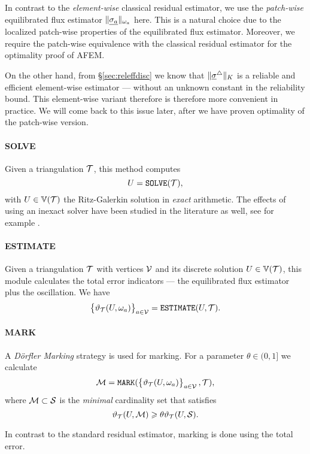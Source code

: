 \documentclass[thesis.tex]{subfiles}
\begin{document}
\begin{rem}
  In contrast to the \emph{element-wise} classical residual estimator, we use the \emph{patch-wise} equilibrated flux estimator $\| \underline{\sigma_a} \|_{\omega_a}$ here. This
  is a natural choice due to the localized patch-wise properties of the equilibrated flux estimator. 
  Moreover, we require the patch-wise equivalence with the classical residual estimator for the optimality proof of AFEM.

  On the other hand, from \S\ref{sec:releffdisc} we know that $\| \underline{\sigma}^\triangle \|_K$ is a reliable and efficient
  element-wise estimator --- without an unknown constant in the reliability bound. This element-wise variant
  therefore is therefore more convenient in practice. We will come back to this issue later, after we have proven
  optimality of the patch-wise version.
\end{rem}


\paragraph{SOLVE}Given a triangulation $\mathcal{T}$, this method computes
\[
  U = \texttt{SOLVE}(\mathcal{T}),
\]
with $U \in \mathbb{V}(\mathcal{T})$ the  Ritz-Galerkin solution in \emph{exact} arithmetic. The effects of using an inexact solver have
been studied in the literature as well, see for example \cite[\S7]{carstensen2014axioms}.
\paragraph{ESTIMATE} Given a triangulation $\mathcal{T}$ with vertices $\mathcal{V}$ and its discrete solution $U \in \mathbb{V}(\mathcal{T})$, this module 
calculates the total error indicators --- the equilibrated flux estimator plus the oscillation. We have
\[
  \set{\vartheta_{\mathcal{T}}(U, \omega_a)}_{a \in \mathcal{V}} = \texttt{ESTIMATE}(U, \mathcal{T}).
\]
\paragraph{MARK}
A \emph{D\"orfler Marking} strategy \cite{dorfler1996convergent} is used for marking. For a parameter $\theta \in (0,1]$ we calculate
\[
  \mathcal{M} = \texttt{MARK}( \set{\vartheta_{\mathcal{T}}(U, \omega_a)}_{a \in \mathcal{V}}, \mathcal{T}),
\]
where $\mathcal{M} \subset \mathcal{S}$ is the \emph{minimal} cardinality set that satisfies
\[
  \vartheta_{\mathcal{T}}(U,\mathcal{M}) \geqslant \theta \vartheta_{\mathcal{T}}(U, \mathcal{S}).
\]
\begin{rem}
  In contrast to the standard residual estimator, marking is done using the total error.
\end{rem}
\end{document}
